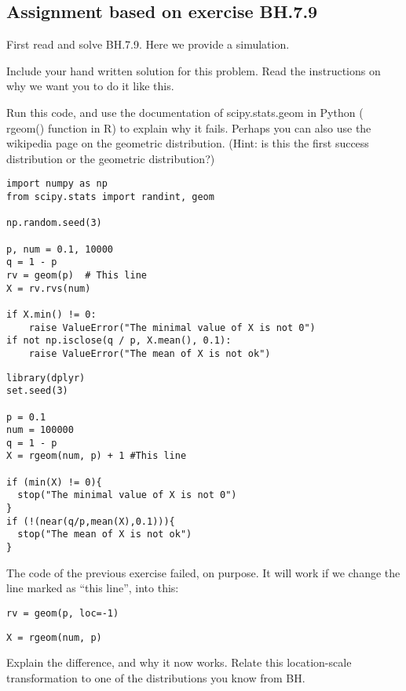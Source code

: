 \subsection{Assignment based on exercise BH.7.9}
\label{sec:bh.7.9}

First read and solve BH.7.9. Here we provide a simulation.

\begin{exercise}
Include your hand written solution for this problem. Read the instructions on why we want you to do it like this.
\end{exercise}


\begin{exercise}
Run this code, and use the documentation of scipy.stats.geom in Python ( rgeom() function in R) to explain why it fails. Perhaps you can also use the wikipedia page on the geometric distribution. (Hint: is this the first success distribution or the geometric distribution?)
\begin{verbatim}
import numpy as np
from scipy.stats import randint, geom

np.random.seed(3)

p, num = 0.1, 10000
q = 1 - p
rv = geom(p)  # This line
X = rv.rvs(num)

if X.min() != 0:
    raise ValueError("The minimal value of X is not 0")
if not np.isclose(q / p, X.mean(), 0.1):
    raise ValueError("The mean of X is not ok")
\end{verbatim}


\begin{verbatim}
library(dplyr)
set.seed(3)

p = 0.1
num = 100000
q = 1 - p
X = rgeom(num, p) + 1 #This line

if (min(X) != 0){
  stop("The minimal value of X is not 0")
}
if (!(near(q/p,mean(X),0.1))){
  stop("The mean of X is not ok")
}
\end{verbatim}
\end{exercise}

\begin{exercise}
The code of the previous exercise failed, on purpose.   It will work if we change the line marked as ``this line'', into this:
\begin{verbatim}
rv = geom(p, loc=-1)
\end{verbatim}

\begin{verbatim}
X = rgeom(num, p)
\end{verbatim}
Explain the difference, and why it now works. Relate this location-scale transformation to one of the distributions you know from BH.
\end{exercise}


